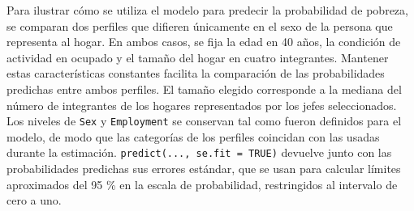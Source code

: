 \documentclass[
  spanish,
  11pt,
  letterpaper,
  oneside,
  open=any]{scrbook}
\begin{document}
Para ilustrar cómo se utiliza el modelo para predecir la probabilidad de
pobreza, se comparan dos perfiles que difieren únicamente en el sexo de
la persona que representa al hogar. En ambos casos, se fija la edad en
40 años, la condición de actividad en ocupado y el tamaño del hogar en
cuatro integrantes. Mantener estas características constantes facilita
la comparación de las probabilidades predichas entre ambos perfiles. El
tamaño elegido corresponde a la mediana del número de integrantes de los
hogares representados por los jefes seleccionados. Los niveles de
\texttt{Sex} y \texttt{Employment} se conservan tal como fueron
definidos para el modelo, de modo que las categorías de los perfiles
coincidan con las usadas durante la estimación.
\texttt{predict(...,\ se.fit\ =\ TRUE)} devuelve junto con las
probabilidades predichas sus errores estándar, que se usan para calcular
límites aproximados del 95 \% en la escala de probabilidad, restringidos
al intervalo de cero a uno.
\end{document}
